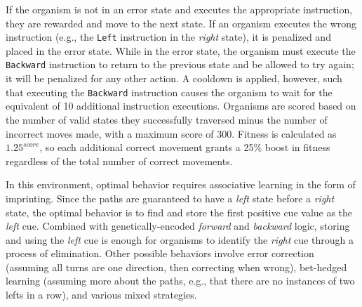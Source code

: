 If the organism is not in an error state and executes the appropriate instruction, they are rewarded and move to the next state. 
If an organism executes the wrong instruction (e.g., the \texttt{Left} instruction in the \textit{right} state), it is penalized and placed in the error state. 
While in the error state, the organism must execute the \texttt{Backward} instruction to return to the previous state and be allowed to try again; it will be penalized for any other action. 
A cooldown is applied, however, such that executing the \texttt{Backward} instruction causes the organism to wait for the equivalent of 10 additional instruction executions.
Organisms are scored based on the number of valid states they successfully traversed minus the number of incorrect moves made, with a maximum score of 300. 
Fitness is calculated as $1.25^{score}$, so each additional correct movement grants a 25\% boost in fitness regardless of the total number of correct movements.



In this environment, optimal behavior requires associative learning in the form of imprinting. 
Since the paths are guaranteed to have a \textit{left} state before a \textit{right} state, the optimal behavior is to find and store the first positive cue value as the \textit{left} cue.
Combined with genetically-encoded \textit{forward} and \textit{backward} logic, storing and using the \textit{left} cue is enough for organisms to identify the \textit{right} cue through a process of elimination. %
Other possible behaviors involve error correction (assuming all turns are one direction, then correcting when wrong), bet-hedged learning (assuming more about the paths, e.g., that there are no instances of two lefts in a row), and various mixed strategies. 

